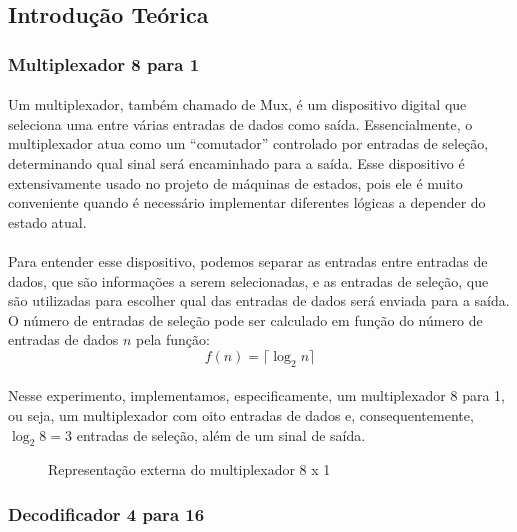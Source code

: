 \documentclass[a4paper,12pt]{article}
\begin{document}
\subsection{Introdução Teórica}

\subsubsection{Multiplexador 8 para 1}
\paragraph{}
Um multiplexador, também chamado de Mux, é um dispositivo digital que seleciona uma entre várias entradas de dados como saída. Essencialmente, o multiplexador atua como um ``comutador'' controlado por entradas de seleção, determinando qual sinal será encaminhado para a saída. Esse dispositivo é extensivamente usado no projeto de máquinas de estados, pois ele é muito conveniente quando é necessário implementar diferentes lógicas a depender do estado atual.

\paragraph{}
Para entender esse dispositivo, podemos separar as entradas entre entradas de dados, que são informações a serem selecionadas, e as entradas de seleção, que são utilizadas para escolher qual das entradas de dados será enviada para a saída. O número de entradas de seleção pode ser calculado em função do número de entradas de dados $n$ pela função:
\[
f(n) = \lceil \log_2n \rceil
\]

\paragraph{}
Nesse experimento, implementamos, especificamente, um multiplexador 8 para 1, ou seja, um multiplexador com oito entradas de dados e, consequentemente, $\log_2 8 = 3$ entradas de seleção, além de um sinal de saída.

\begin{figure}[H]
    \centering
    
    \caption{Representação externa do multiplexador 8 x 1}
    \label{fig:Mux_externa}
\end{figure}

\subsubsection{Decodificador 4 para 16}
\end{document}
